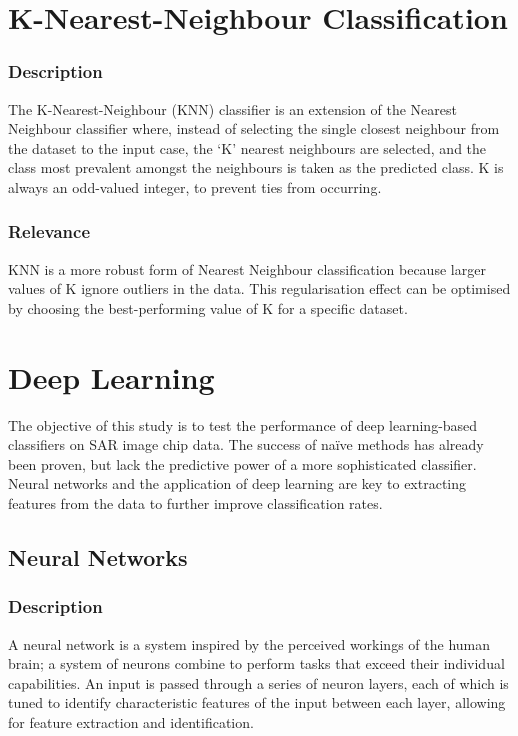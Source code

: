 \section{K-Nearest-Neighbour Classification}\label{lit:knn}
\subsubsection{Description}
The K-Nearest-Neighbour (KNN) classifier is an extension of the Nearest Neighbour classifier where, instead of selecting the single closest neighbour from the dataset to the input case, the `K' nearest neighbours are selected, and the class most prevalent amongst the neighbours is taken as the predicted class. K is always an odd-valued integer, to prevent ties from occurring. 

\subsubsection{Relevance}
KNN is a more robust form of Nearest Neighbour classification because larger values of K ignore outliers in the data. This regularisation effect can be optimised by choosing the best-performing value of K for a specific dataset.

\section{Deep Learning}

The objective of this study is to test the performance of deep learning-based classifiers on SAR image chip data. The success of na{\"i}ve methods has already been proven\cite{Schumacher_atrof}, but lack the predictive power of a more sophisticated classifier. Neural networks and the application of deep learning are key to extracting features from the data to further improve classification rates.

\subsection{Neural Networks}
\subsubsection{Description}
A neural network is a system inspired by the perceived workings of the human brain; a system of neurons combine to perform tasks that exceed their individual capabilities. An input is passed through a series of neuron layers, each of which is tuned to identify characteristic features of the input between each layer, allowing for feature extraction and identification. 

